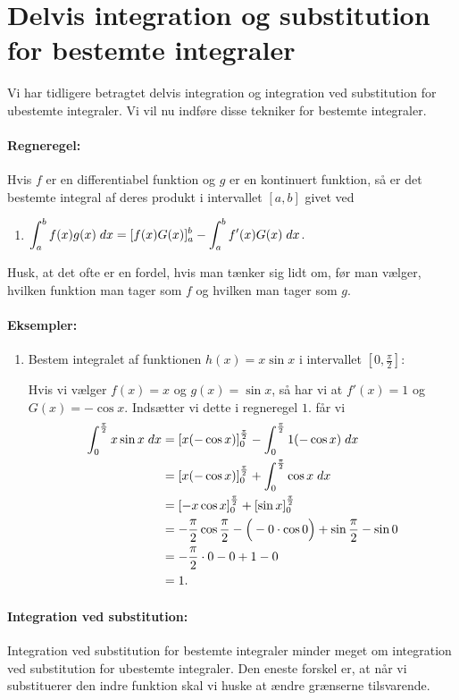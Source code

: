 \section{Delvis integration og substitution for bestemte integraler}
\noindent Vi har tidligere betragtet delvis integration og integration ved substitution for ubestemte integraler. Vi vil nu indføre disse tekniker for bestemte integraler.

\paragraph*{Regneregel:}
Hvis $f$ er en differentiabel funktion og $g$ er en kontinuert funktion, så er det bestemte integral af deres produkt i intervallet $[a,b]$ givet ved
\begin{enumerate}
\item $\displaystyle \int_a^b f(x)g(x) \; d x = [f(x)G(x)]_a^b - \int_a^b f'(x)G(x) \; d x$.
\end{enumerate}
Husk, at det ofte er en fordel, hvis man tænker sig lidt om, før man vælger, hvilken funktion man tager som $f$ og hvilken man tager som $g$. 
\paragraph*{Eksempler:}
\begin{enumerate}
\item Bestem integralet af funktionen $h(x)=x \sin x$ i intervallet $[0,\frac{\pi}{2}]$:

Hvis vi vælger $f(x)=x$ og $g(x)=\sin x$, så har vi at $f'(x)=1$ og $G(x)=-\cos x$. Indsætter vi dette i regneregel $1$. får vi
\begin{align*}
\int_0^\frac{\pi}{2} x \sin x \; d x &= [x  (- \cos x)]_0^\frac{\pi}{2}-\int_0^\frac{\pi}{2} 1 (-\cos x ) \; d x \\
&= [x  (- \cos x)]_0^\frac{\pi}{2}+\int_0^\frac{\pi}{2} \cos x  \; d x \\
&=[-x\cos x]_0^\frac{\pi}{2}  + [\sin x]_0^\frac{\pi}{2} \\
&=- \frac{\pi}{2} \cos \frac{\pi}{2} - \Big( -0 \cdot \cos 0 \Big) + \sin \frac{\pi}{2} - \sin 0 \\
&= - \frac{\pi}{2} \cdot 0 - 0 + 1 - 0 \\
&= 1.
\end{align*}
\end{enumerate}

\paragraph*{Integration ved substitution:}
Integration ved substitution for bestemte integraler minder meget om integration ved substitution for ubestemte integraler. Den eneste forskel er, at når vi substituerer den indre funktion skal vi huske at ændre grænserne tilsvarende.

